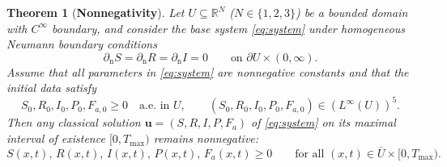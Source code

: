 \documentclass[pdflatex,sn-mathphys-ay]{sn-jnl}
\theoremstyle{thmstyleone}
\newtheorem{theorem}{Theorem}[section]
\theoremstyle{definition}
\theoremstyle{remark}
\begin{document}
\begin{theorem}[\textbf{Nonnegativity}]
\label{thm:positivity}
Let $U\subseteq\mathbb{R}^N$ ($N\in\{1,2,3\}$) be a bounded domain with $C^\infty$ boundary, and consider the base system \eqref{eq:system} under homogeneous Neumann boundary conditions
\[
\partial_{\mathrm n}S=\partial_{\mathrm n}R=\partial_{\mathrm n}I=0 \qquad \text{on }\partial U\times(0,\infty).
\]
Assume that all parameters in \eqref{eq:system} are nonnegative constants and that the initial data satisfy
\[
S_0,R_0,I_0,P_0,F_{a,0}\ge 0 \quad \text{a.e.\ in }U,
\qquad 
(S_0,R_0,I_0,P_0,F_{a,0})\in (L^\infty(U))^5.
\]
Then any classical solution $\mathbf{u}=(S,R,I,P,F_a)$ of \eqref{eq:system} on its maximal interval of existence $[0,T_{\max})$ remains nonnegative:
\[
S(x,t),\,R(x,t),\,I(x,t),\,P(x,t),\,F_a(x,t)\ge 0
\qquad \text{for all }(x,t)\in \overline U\times[0,T_{\max}).
\]
\end{theorem}
\end{document}
